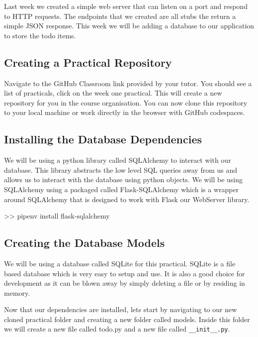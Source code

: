 \documentclass{csse4400}
\begin{document}
Last week we created a simple web server that can listen on a port and respond to HTTP requests. The endpoints that we created are all stubs the return a simple JSON response. This week we will be adding a database to our application to store the todo items.

\subsection{Creating a Practical Repository}
Navigate to the GitHub Classroom link provided by your tutor.
You should see a list of practicals, click on the week one practical.
This will create a new repository for you in the course organisation.
You can now clone this repository to your local machine or work directly in the browser with GitHub codespaces.


\subsection{Installing the Database Dependencies}

We will be using a python library called SQLAlchemy to interact with our database. This library abstracts the low level SQL queries away from us and allows us to interact with the database using python objects. We will be using SQLAlchemy using a packaged called Flask-SQLAlchemy which is a wrapper around SQLAlchemy that is designed to work with Flask our WebServer library.

\begin{code}[language=bash,numbers=none]{}
  >> pipenv install flask-sqlalchemy
\end{code}

\subsection{Creating the Database Models}

We will be using a database called SQLite for this practical. SQLite is a file based database which is very easy to setup and use. It is also a good choice for development as it can be blown away by simply deleting a file or by residing in memory.

Now that our dependencies are installed, lets start by navigating to our new cloned practical folder and creating a new folder called models. Inside this folder we will create a new file called todo.py and a new file called \texttt{\_\_init\_\_.py}.
\end{document}
